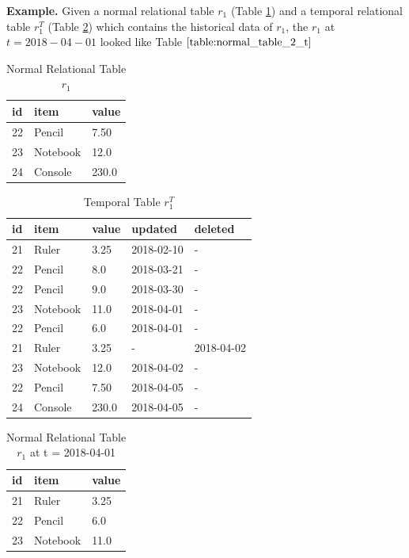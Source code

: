 \textbf{Example.} Given a normal relational table $r_1$ (Table \ref{table:normal_table_2}) and a temporal relational table $r_1^T$ (Table \ref{table:temporal_table_2}) which contains the historical data of $r_1$, the $r_1$ at $t=2018-04-01$ looked like Table $\ref{table:normal_table_2_t}$
\begin{center}

\begin{table}[t]
	\centering
	\caption{Normal Relational Table $r_1$}
	\label{table:normal_table_2}
	\begin{tabular}{p{4cm}p{4cm}p{4cm}}
		\hline
		id & item      & value  \\ \hline
		22 & Pencil    & 7.50 \\
		23 & Notebook & 12.0   \\ 
		24 & Console & 230.0 \\ \hline
	\end{tabular}
\end{table}

\begin{table}[t]
	\centering
	\caption{Temporal Table $r_1^T$}
	\label {table:temporal_table_2}
	\begin{tabular}{p{1cm}p{2cm}p{3cm}p{3cm}p{2cm}}
		\hline
		id & item      & value  & updated  & deleted\\ \hline
		21 & Ruler    & 3.25  & 2018-02-10  &  - \\  
		22 & Pencil    & 8.0  & 2018-03-21  &  - \\
		22 & Pencil    & 9.0  & 2018-03-30  &  -\\
		23 & Notebook & 11.0  & 2018-04-01 & - \\
		22 & Pencil & 6.0  & 2018-04-01 & - \\
		21 & Ruler    & 3.25  & -  &  2018-04-02 \\
		23 & Notebook & 12.0  & 2018-04-02 & - \\ 
		22 & Pencil & 7.50  & 2018-04-05 & - \\ 
		24 & Console & 230.0  & 2018-04-05 & - \\ \hline
	\end{tabular}
\end{table}
\end{center}
\begin{center}
\begin{table}
	\centering
	\caption{Normal Relational Table $r_1$ at t = 2018-04-01}
	\label{table:normal_table_2_t}
	\begin{tabular}{p{4cm}p{4cm}p{4cm}}
		\hline
		id & item  & value  \\ \hline
		21 & Ruler & 3.25 \\
		22 & Pencil & 6.0   \\ 
		23 & Notebook & 11.0 \\ \hline
	\end{tabular}
\end{table}
\end{center}

